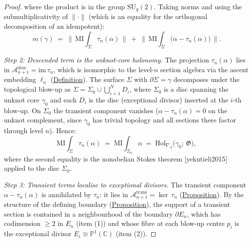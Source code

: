 \begin{proof}
where the product is in the group $\mathrm{SU}_{q}(2)$.  Taking norms
and using the submultiplicativity of $\lVert\cdot\rVert$ (which is an
equality for the orthogonal decomposition of an idempotent):
\[
m(\gamma)
  \;=\;
  \bigl\lVert\,
  \mathrm{MI}\!\!\int_\Sigma \tau_n(\alpha)
  \,\bigr\rVert
  \;+\;
  \bigl\lVert\,
  \mathrm{MI}\!\!\int_\Sigma
  \bigl(\alpha - \tau_n(\alpha)\bigr)
  \,\bigr\rVert.
\]

\emph{Step 2: Descended term is the unknot-core holonomy.}
The projection $\tau_n(\alpha)$ lies in
$\mathcal{A}_{n+1}^{\mathrm{desc}} = \mathrm{im}\,\tau_n$, which is
isomorphic to the level-$n$ section algebra via the ascent embedding
$\ell_n$ (\hyperref[def:descent-involution]{Definition}).  The surface
$\Sigma$ with $\partial\Sigma = \gamma$ decomposes under the topological
blow-up as $\Sigma = \Sigma_0 \cup \bigcup_{i=1}^N D_i$, where
$\Sigma_0$ is a disc spanning the unknot core $\gamma_0$ and each
$D_i$ is the disc (exceptional divisor) inserted at the $i$-th blow-up.
On $\Sigma_0$ the transient component vanishes
($\alpha - \tau_n(\alpha) = 0$ on the unknot complement, since $\gamma_0$
has trivial topology and all sections there factor through level $n$).
Hence:
\[
\mathrm{MI}\!\!\int_\Sigma \tau_n(\alpha)
  \;=\;
  \mathrm{MI}\!\!\int_{\Sigma_0} \alpha
  \;=\;
  \mathrm{Hol}_{\nabla_A}\!\bigl(\gamma_0;\, \mathfrak{G}\bigr),
\]
where the second equality is the nonabelian Stokes
theorem [yekutieli2015] applied to the disc $\Sigma_0$.

\emph{Step 3: Transient terms localise to exceptional divisors.}
The transient component $\alpha - \tau_n(\alpha)$ is annihilated by
$\tau_n$: it lies in
$\mathcal{A}_{n+1}^{\mathrm{trans}} = \ker\,\tau_n$
(\hyperref[prop:descent-eigenspaces]{Proposition}).  By the structure of the
defining boundary (\hyperref[prop:brane-boundary]{Proposition}), the support of
a transient section is contained in a neighbourhood of the boundary
$\partial E_n$, which has codimension $\geq 2$ in $E_n$ (item (1)) and
whose fibre at each blow-up centre $p_i$ is the exceptional divisor
$E_i \cong \mathbb{P}^1(\mathbb{C})$ (item (2)).


\end{proof}
